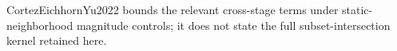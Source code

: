 CortezEichhornYu2022 bounds the relevant cross-stage terms under static-neighborhood magnitude controls; it does not state the full subset-intersection kernel retained here.